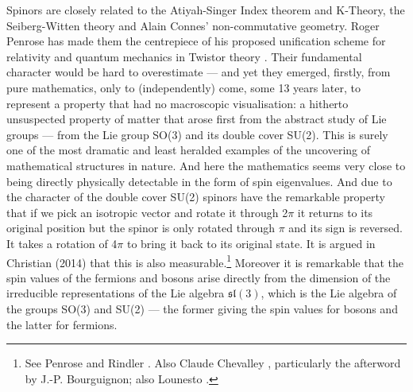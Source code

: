 \documentclass[11pt,oneside,a4paper]{article}
\begin{document}
Spinors are closely related to the Atiyah-Singer Index theorem and K-Theory, the Seiberg-Witten theory and Alain Connes' non-commutative geometry. Roger Penrose has made them the centrepiece of his proposed unification scheme for relativity and quantum mechanics in Twistor theory \parencite{penrose_road_2004}. Their fundamental character would be hard to overestimate --- and yet they emerged, firstly, from pure mathematics, only to (independently) come, some 13 years later, to represent a property that had no macroscopic visualisation: a hitherto unsuspected property of matter that arose first from the abstract study of Lie groups --- from the Lie group SO(3) and its double cover SU(2). This is surely one of the most dramatic and least heralded examples of the uncovering of mathematical structures in nature. And here the mathematics seems very close to being directly physically detectable in the form of spin eigenvalues. And due to the character of the double cover SU(2) spinors have the remarkable property that if we pick an isotropic vector and rotate it through 2$\pi$ it returns to its original position but the spinor is only rotated through $\pi$ and its sign is reversed. It takes a rotation of 4$\pi$ to bring it back to its original state. It is argued in Christian (2014) that this is also measurable.\footnote{See Penrose and Rindler \parencites*{penrose_spinors_1987}{penrose_spinors_1988}. Also Claude Chevalley \parencite*{chevalley_algebraic_1997}, particularly the afterword by J.-P. Bourguignon; also Lounesto \parencite*{lounesto_clifford_2001}.} Moreover it is remarkable that the spin values of the fermions and bosons arise directly from the dimension of the irreducible representations of the Lie algebra $\mathfrak{sl} (3)$, which is the Lie algebra of the groups SO(3) and SU(2) --- the former giving the spin values for bosons and the latter for fermions.
\end{document}
